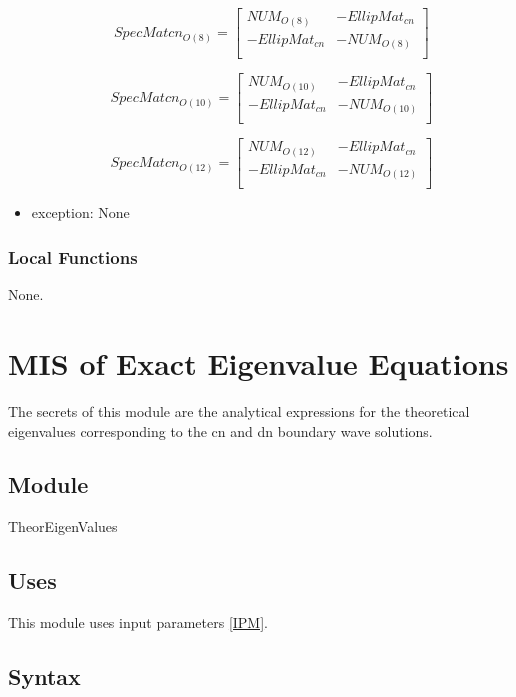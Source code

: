 \documentclass[12pt, titlepage]{article}
\begin{document}
\begin{itemize}
 \[
SpecMatcn_{O(8)}=
\left[ {\begin{array}{cc}
	NUM_{O(8)} & -EllipMat_{cn} \\
	-EllipMat_{cn} & -NUM_{O(8)} \\
	\end{array} } \right]
\] 

\[
SpecMatcn_{O(10)}=
\left[ {\begin{array}{cc}
	NUM_{O(10)} & -EllipMat_{cn} \\
	-EllipMat_{cn} & -NUM_{O(10)} \\
	\end{array} } \right]
\] 

\[
SpecMatcn_{O(12)}=
\left[ {\begin{array}{cc}
	NUM_{O(12)} & -EllipMat_{cn} \\
	-EllipMat_{cn} & -NUM_{O(12)} \\
	\end{array} } \right]
\] 
	\item exception: None
\end{itemize}

\subsubsection{Local Functions} 

None. 

\newpage

\section{MIS of Exact Eigenvalue Equations} \label{SEE}

The secrets of this module are the analytical expressions for the theoretical 
eigenvalues corresponding to the cn and dn boundary wave solutions.

\subsection{Module}

TheorEigenValues

\subsection{Uses}

This module uses input parameters \ref{IPM}. 

\subsection{Syntax}
\end{document}
